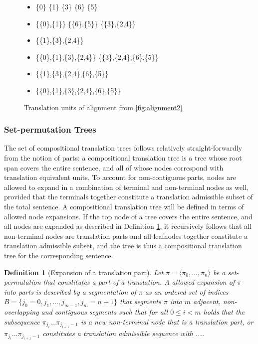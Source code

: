 \documentclass{report}
\theoremstyle{definition}
\theoremstyle{plain}
\newtheorem{definition}{Definition}
\begin{document}
\begin{figure}[!ht]
\begin{framed}
\small{
\begin{itemize}
\item \{0\} \hfill \{1\} \hfill \{3\} \hfill \{6\} \hfill \{5\} \hfill
\item \{\{0\},\{1\}\} \hfill  \{\{6\},\{5\}\} \hfill \{\{3\},\{2,4\}\}
\item \{\{1\},\{3\},\{2,4\}\}
\item \{\{0\},\{1\},\{3\},\{2,4\}\} \hfill \{\{3\},\{2,4\},\{6\},\{5\}\}
\item \{\{1\},\{3\},\{2,4\},\{6\},\{5\}\}
\item \{\{0\},\{1\},\{3\},\{2,4\},\{6\},\{5\}\}
\end{itemize}
}
\end{framed}
\caption{Translation units of alignment from \ref{fig:alignment2}}\label{fig:transequi}
\end{figure}


\subsubsection{Set-permutation Trees}

The set of compositional translation trees follows relatively straight-forwardly from the notion of parts: a compositional translation tree is a tree whose root span covers the entire sentence, and all of whose nodes correspond with translation equivalent units. To account for non-contiguous parts, nodes are allowed to expand in a combination of terminal and non-terminal nodes as well, provided that the terminals together constitute a translation admissible subset of the total sentence. A compositional translation tree will be defined in terms of allowed node expansions. If the top node of a tree covers the entire sentence, and all nodes are expanded as described in Definition \ref{def:exp1}, it recursively follows that all non-terminal nodes are translation parts and all leafnodes together constitute a translation admissible subset, and the tree is thus a compositional translation tree for the corresponding sentence.

\begin{definition}[Expansion of a translation part]\label{def:exp1}
Let $\pi = \langle \pi_0, \ldots,\pi_n\rangle$ be a set-permutation that constitutes a part of a translation. A allowed expansion of $\pi$ into parts is described by a segmentation of $\pi$ as an ordered set of indices $B = \{j_0 = 0, j_1, \ldots ,j_{m-1},j_m = n+1\}$ that segments $\pi$ into $m$ adjacent, non-overlapping and contiguous segments such that for all $0\leq i < m$ holds that the subsequence $\pi_{j_i}\ldots\pi_{j_{i+1}-1}$ is a new non-terminal node that is a translation part, or $\pi_{j_i}\ldots\pi_{j_{i+1}-1}$ constitutes a translation admissible sequence with ....
\end{definition}
\end{document}
